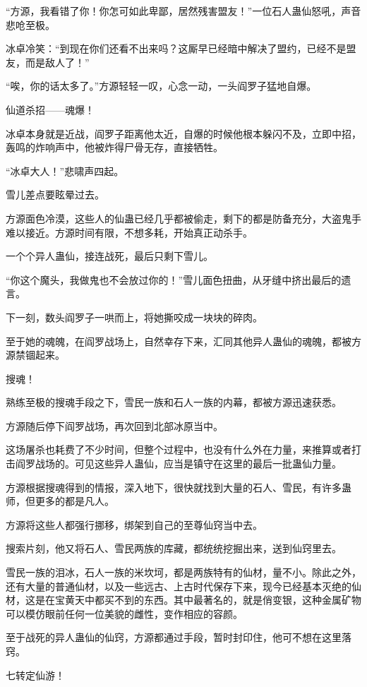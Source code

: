 \begin{this_body}
“方源，我看错了你！你怎可如此卑鄙，居然残害盟友！”一位石人蛊仙怒吼，声音悲呛至极。

冰卓冷笑：“到现在你们还看不出来吗？这厮早已经暗中解决了盟约，已经不是盟友，而是敌人了！”

“唉，你的话太多了。”方源轻轻一叹，心念一动，一头阎罗子猛地自爆。

仙道杀招——魂爆！

冰卓本身就是近战，阎罗子距离他太近，自爆的时候他根本躲闪不及，立即中招，轰鸣的炸响声中，他被炸得尸骨无存，直接牺牲。

“冰卓大人！”悲啸声四起。

雪儿差点要眩晕过去。

方源面色冷漠，这些人的仙蛊已经几乎都被偷走，剩下的都是防备充分，大盗鬼手难以接近。方源时间有限，不想多耗，开始真正动杀手。

一个个异人蛊仙，接连战死，最后只剩下雪儿。

“你这个魔头，我做鬼也不会放过你的！”雪儿面色扭曲，从牙缝中挤出最后的遗言。

下一刻，数头阎罗子一哄而上，将她撕咬成一块块的碎肉。

至于她的魂魄，在阎罗战场上，自然幸存下来，汇同其他异人蛊仙的魂魄，都被方源禁锢起来。

搜魂！

熟练至极的搜魂手段之下，雪民一族和石人一族的内幕，都被方源迅速获悉。

方源随后停下阎罗战场，再次回到北部冰原当中。

这场屠杀也耗费了不少时间，但整个过程中，也没有什么外在力量，来推算或者打击阎罗战场的。可见这些异人蛊仙，应当是镇守在这里的最后一批蛊仙力量。

方源根据搜魂得到的情报，深入地下，很快就找到大量的石人、雪民，有许多蛊师，但更多的都是凡人。

方源将这些人都强行挪移，绑架到自己的至尊仙窍当中去。

搜索片刻，他又将石人、雪民两族的库藏，都统统挖掘出来，送到仙窍里去。

雪民一族的泪冰，石人一族的米坎坷，都是两族特有的仙材，量不小。除此之外，还有大量的普通仙材，以及一些远古、上古时代保存下来，现今已经基本灭绝的仙材，这是在宝黄天中都买不到的东西。其中最著名的，就是俏变银，这种金属矿物可以模仿眼前任何一位美貌的雌性，变作相应的容颜。

至于战死的异人蛊仙的仙窍，方源都通过手段，暂时封印住，他可不想在这里落窍。

七转定仙游！


\end{this_body}
